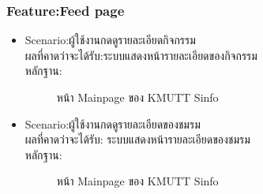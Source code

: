 \documentclass[14pt,oneside,openright,a4paper]{cpe-thai-project}
\begin{document}
\subsubsection{Feature:Feed page}
\begin{itemize}
  \item Scenario:ผู้ใช้งานกดดูรายละเอียดกิจกรรม\\ผลที่คาดว่าจะได้รับ:ระบบแสดงหน้ารายละเอียดของกิจกรรม\\หลักฐาน:\\
  \begin{figure}[!h]\centering
    \setlength{\fboxrule}{0.5mm} %
    \setlength{\fboxsep}{0.5cm}
    \caption{หน้า Mainpage ของ KMUTT Sinfo}\label{fig:sinfo}
  \end{figure}
\end{itemize}
\newpage
\begin{itemize}
  \item Scenario:ผู้ใช้งานกดดูรายละเอียดของชมรม\\ผลที่คาดว่าจะได้รับ: ระบบแสดงหน้ารายละเอียดของชมรม\\หลักฐาน:\\
  \begin{figure}[!h]\centering
    \setlength{\fboxrule}{0.5mm} %
    \setlength{\fboxsep}{0.5cm}
    \caption{หน้า Mainpage ของ KMUTT Sinfo}\label{fig:sinfo}
  \end{figure}
\end{itemize}
\newpage
\end{document}
